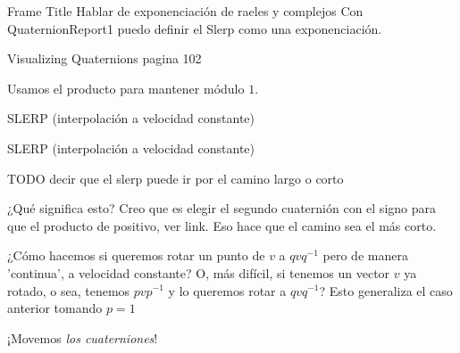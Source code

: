 \documentclass[10pt]{beamer}
\def\m{^{-1}}
\begin{document}
\fi

\iffalse
\begin{frame}{Frame Title}
    Hablar de exponenciación de raeles y complejos
    Con QuaternionReport1 puedo definir el Slerp como una exponenciación.
    
    Visualizing Quaternions pagina 102
    
    Usamos el producto para mantener módulo $1$.
\end{frame}



\begin{frame}{SLERP (interpolación a velocidad constante)}

\end{frame}

\begin{frame}{SLERP (interpolación a velocidad constante)}

\Huge{TODO decir que el slerp puede ir por el camino largo o corto} %


¿Qué significa esto? Creo que es elegir el segundo cuaternión con el signo para que el producto de positivo, ver link. Eso hace que el camino sea el más corto.


¿Cómo hacemos si queremos rotar un punto de $v$ a $qvq\m$ pero de manera 'continua', a velocidad constante? O, más difícil, si tenemos un vector $v$ ya rotado, o sea, tenemos $p v p\m$ y lo queremos rotar a $q v q\m$? Esto generaliza el caso anterior tomando $p = 1$ 

¡Movemos \textit{los cuaterniones}!







\end{frame}
\end{document}
